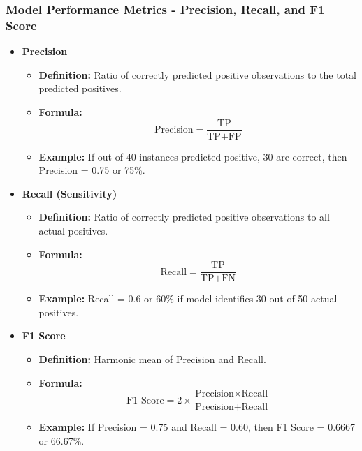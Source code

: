 \documentclass[aspectratio=169]{beamer}
\begin{document}
\begin{frame}[fragile]
    \frametitle{Model Performance Metrics - Precision, Recall, and F1 Score}
    \begin{itemize}
        \item \textbf{Precision}
        \begin{itemize}
            \item \textbf{Definition:} Ratio of correctly predicted positive observations to the total predicted positives.
            \item \textbf{Formula:}
            \[
            \text{Precision} = \frac{\text{TP}}{\text{TP} + \text{FP}}
            \]
            \item \textbf{Example:} If out of 40 instances predicted positive, 30 are correct, then Precision = 0.75 or 75\%.
        \end{itemize}
        
        \item \textbf{Recall (Sensitivity)}
        \begin{itemize}
            \item \textbf{Definition:} Ratio of correctly predicted positive observations to all actual positives.
            \item \textbf{Formula:}
            \[
            \text{Recall} = \frac{\text{TP}}{\text{TP} + \text{FN}}
            \]
            \item \textbf{Example:} Recall = 0.6 or 60\% if model identifies 30 out of 50 actual positives.
        \end{itemize}
        
        \item \textbf{F1 Score}
        \begin{itemize}
            \item \textbf{Definition:} Harmonic mean of Precision and Recall.
            \item \textbf{Formula:}
            \[
            \text{F1 Score} = 2 \times \frac{\text{Precision} \times \text{Recall}}{\text{Precision} + \text{Recall}}
            \]
            \item \textbf{Example:} If Precision = 0.75 and Recall = 0.60, then F1 Score = 0.6667 or 66.67\%.
        \end{itemize}
    \end{itemize}
\end{frame}
\end{document}
